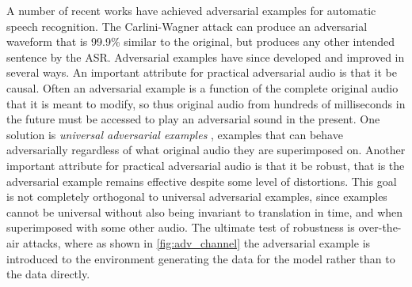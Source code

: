 \documentclass{article}
\begin{document}
A number of recent works have achieved adversarial examples for automatic speech recognition.
The Carlini-Wagner attack \cite{cw} can produce an adversarial waveform that is 99.9\% similar to the original, but produces any other intended sentence by the ASR.
Adversarial examples have since developed and improved in several ways.
An important attribute for practical adversarial audio is that it be causal.
Often an adversarial example is a function of the complete original audio that it is meant to modify, so thus original audio from hundreds of milliseconds in the future must be accessed to play an adversarial sound in the present.
One solution is {\it universal adversarial examples} \cite{univadv}, examples that can behave adversarially regardless of what original audio they are superimposed on.
Another important attribute for practical adversarial audio is that it be robust, that is the adversarial example remains effective despite some level of distortions.
This goal is not completely orthogonal to universal adversarial examples, since examples cannot be universal without also being invariant to translation in time, and when superimposed with some other audio.
The ultimate test of robustness is over-the-air attacks, where as shown in \cref{fig:adv_channel} the adversarial example is introduced to the environment generating the data for the model rather than to the data directly.
\end{document}
